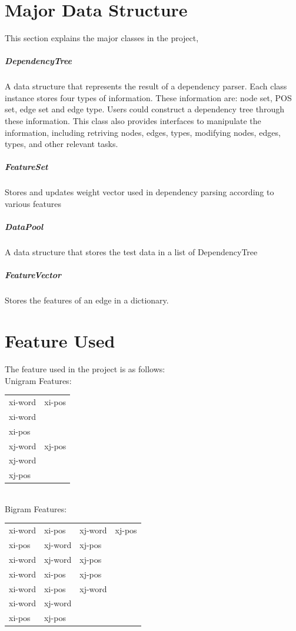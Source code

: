 \documentclass[11pt]{article}
\begin{document}
\section{Major Data Structure}

This section explains the major classes in the project,

\subparagraph{DependencyTree}
A data structure that represents the result of a dependency parser. Each class instance stores four types of information. These information are: node set, POS set, edge set and edge type. Users could construct a dependency tree through these information. This class also provides interfaces to manipulate the information, including retriving nodes, edges, types, modifying nodes, edges, types, and other relevant tasks.

\subparagraph{FeatureSet}
Stores and updates weight vector used in dependency parsing according to
various features

\subparagraph{DataPool}
A data structure that stores the test data in a list of DependencyTree

\subparagraph{FeatureVector}
Stores the features of an edge in a dictionary.


\section{Feature Used}

The feature used in the project is as follows: \\


Unigram Features: \\

\begin{tabular}{|l l|}
	\hline
		xi-word& xi-pos \\
		xi-word& \\
		xi-pos & \\
		xj-word& xj-pos \\
		xj-word& \\
		xj-pos& \\
	\hline
\end{tabular} \\




Bigram Features: \\

\begin{tabular}{|l l l l| }
	\hline
		xi-word& xi-pos& xj-word& xj-pos \\
		xi-pos& xj-word& xj-pos & \\
		xi-word& xj-word& xj-pos & \\
		xi-word& xi-pos& xj-pos &\\
		xi-word& xi-pos& xj-word& \\
		xi-word& xj-word & &\\
		xi-pos& xj-pos  & &\\
	\hline
\end{tabular} \\
\end{document}
